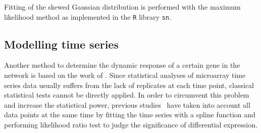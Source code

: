 Fitting of the skewed Gaussian distribution is performed with
the maximum likelihood method as implemented in the 
\texttt{R}
library \texttt{sn}.

\subsection{Modelling time series}
Another method to determine the dynamic response of a certain
gene in the network is based on the work of \cite{Mar2009}. 
Since statistical analyses of microarray time series data usually 
suffers from the lack
of replicates at each time point, classical statistical tests 
cannot be directly applied. In order to 
circumvent this problem and increase the statistical power,
previous studies~\citep{Bar-Joseph2003,Storey2005} have taken into 
account all data points at the
same time by fitting the time series with a spline function and 
performing likelihood ratio test to judge the significance of 
differential expression.

